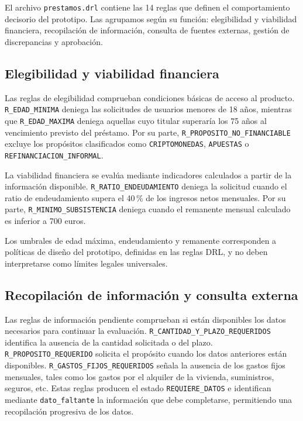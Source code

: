 \documentclass[12pt,a4paper]{report}
\begin{document}
El archivo \texttt{prestamos.drl} contiene las 14 reglas que definen el comportamiento decisorio del prototipo. Las agrupamos según su función: elegibilidad y viabilidad financiera, recopilación de información, consulta de fuentes externas, gestión de discrepancias y aprobación.

\subsection{Elegibilidad y viabilidad financiera}

Las reglas de elegibilidad comprueban condiciones básicas de acceso al producto. \texttt{R\_EDAD\_MINIMA} deniega las solicitudes de usuarios menores de 18 años, mientras que \texttt{R\_EDAD\_MAXIMA} deniega aquellas cuyo titular superaría los 75 años al vencimiento previsto del préstamo. Por su parte, \texttt{R\_PROPOSITO\_NO\_FINANCIABLE} excluye los propósitos clasificados como \texttt{CRIPTOMONEDAS}, \texttt{APUESTAS} o \texttt{REFINANCIACION\_INFORMAL}.

La viabilidad financiera se evalúa mediante indicadores calculados a partir de la información disponible. \texttt{R\_RATIO\_ENDEUDAMIENTO} deniega la solicitud cuando el ratio de endeudamiento supera el 40\,\% de los ingresos netos mensuales. Por su parte, \texttt{R\_MINIMO\_SUBSISTENCIA} deniega cuando el remanente mensual calculado es inferior a 700 euros.

Los umbrales de edad máxima, endeudamiento y remanente corresponden a políticas de diseño del prototipo, definidas en las reglas DRL, y no deben interpretarse como límites legales universales.

\subsection{Recopilación de información y consulta externa}

Las reglas de información pendiente comprueban si están disponibles los datos necesarios para continuar la evaluación. \texttt{R\_CANTIDAD\_Y\_PLAZO\_REQUERIDOS} identifica la ausencia de la cantidad solicitada o del plazo. \texttt{R\_PROPOSITO\_REQUERIDO} solicita el propósito cuando los datos anteriores están disponibles. \texttt{R\_GASTOS\_FIJOS\_REQUERIDOS} señala la ausencia de los gastos fijos mensuales, tales como los gastos por el alquiler de la vivienda, suministros, seguros, etc. Estas reglas producen el estado \texttt{REQUIERE\_DATOS} e identifican mediante \texttt{dato\_faltante} la información que debe completarse, permitiendo una recopilación progresiva de los datos.
\end{document}
